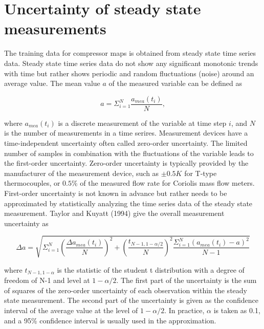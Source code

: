 \section{Uncertainty of steady state measurements}
\label{sec:unc_steady}
The training data for compressor maps is obtained from steady state time series data. Steady state time series data do not show any significant monotonic trends with time but rather shows periodic and random fluctuations (noise) around an average value. The mean value $a$ of the measured variable can be defined as

\begin{equation}
a = \Sigma _{i = 1}^N{\frac{{{a_{mea}}({t_i})}}{N}},
\label{eq:avg_mea}
\end{equation}

where $a_{mea}(t_i)$ is a discrete measurement of the variable at time step $i$, and $N$ is the number of measurements in a time serires. Measurement devices have a time-independent uncertainty often called zero-order uncertainty. The limited number of samples in combination with the fluctuations of the variable leads to the first-order uncertainty.  Zero-order uncertainty is typically provided by the manufacturer of the measurement device, such as $\pm0.5K$ for T-type thermocouples, or $0.5\%$ of the measured flow rate for Coriolis mass flow meters. First-order uncertainty is not known in advance but rather needs to be approximated by statistically analyzing the time series data of the steady state measurement. Taylor and Kuyatt (1994)\cite{Kamei:1995} give the overall measurement uncertainty as

\begin{equation}
\Delta a = \sqrt {\Sigma _{i = 1}^N{{\left(\frac{{\Delta {a_{mea}}({t_i})}}{N}\right)}^2} + {{\left(\frac{{{t_{N - 1,1 - \alpha /2}}}}{N}\right)}^2}\frac{{\Sigma _{i = 1}^N{{\left({a_{mea}}({t_i}) - a\right)}^2}}}{{N - 1}}} 
\label{eq:mea_unc_TK}
\end{equation}

where $t_{N-1,1-\alpha}$ is the statistic of the student t distribution with a degree of freedom of N-1 and level at $1-\alpha/2$. The first part of the uncertainty is the sum of squares of the zero-order uncertainty of each observation within the steady state measurement. The second part of the uncertainty is given as the confidence interval of the average value at the level of $1-\alpha/2$. In practice, $\alpha$ is taken as 0.1, and a 95\% confidence interval is usually used in the approximation.
